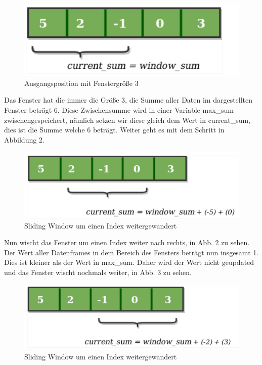 \documentclass{article}
\begin{document}
\begin{center}
\begin{figure}[h]
    \centering
    \includegraphics[width=\textwidth]{slidingwindow1.png}
    \caption{Ausgangsposition mit Fenstergröße 3}
\end{figure}
\end{center}
\break

Das Fenster hat die immer die Größe 3, die Summe aller Daten im dargestellten Fenster beträgt 6. Diese Zwischensumme wird in einer Variable max\_sum zwischengespeichert, nämlich
setzen wir diese gleich dem Wert in current\_sum, dies ist die Summe welche 6 beträgt. Weiter geht es mit dem Schritt in Abbildung 2.

\begin{center}
\begin{figure}[h]
    \centering
    \includegraphics[width=\textwidth]{slidingwindow2.png}
    \caption{Sliding Window um einen Index weitergewandert}
\end{figure}
\end{center}

Nun wischt das Fenster um einen Index weiter nach rechts, in Abb. 2 zu sehen. Der Wert aller Datenframes in dem Bereich des Fensters beträgt nun insgesamt 1. Dies ist kleiner als der Wert in max\_sum. Daher wird der Wert nicht geupdated und das Fenster wischt nochmals weiter, in Abb. 3 zu sehen.

\begin{center}
\begin{figure}[h]
    \centering
    \includegraphics[width=\textwidth]{slidingwindow3.png}
    \caption{Sliding Window um einen Index weitergewandert}
\end{figure}
\end{center}
\break
\end{document}

